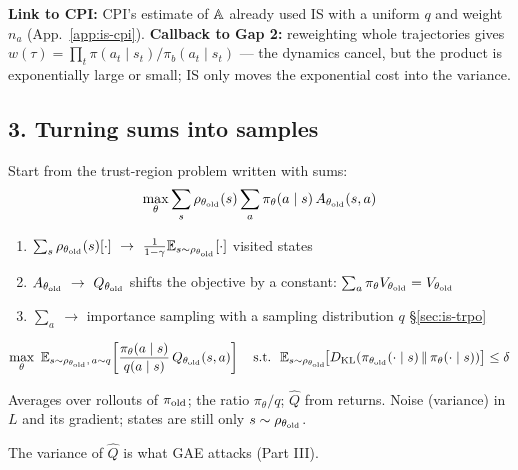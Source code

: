 \begin{notebox}
\textbf{Link to CPI:} CPI's estimate of $\mathbb{A}$ already used IS with a uniform $q$ and weight $n_a$ (App.~\ref{app:is-cpi}).
\textbf{Callback to Gap 2:} reweighting whole trajectories gives $w(\tau)=\prod_t\pi(a_t\mid s_t)/\pi_b(a_t\mid s_t)$ --- the dynamics cancel, but the product is exponentially large or small; IS only moves the exponential cost into the variance.
\end{notebox}

\subsection{3. Turning sums into samples}

Start from the trust-region problem written with sums:
\begin{gather*}
  \max_\theta \sum_s \rho_{\theta_{\mathrm{old}}}(s) \sum_a \pi_\theta(a\mid s)\, A_{\theta_{\mathrm{old}}}(s,a)
\end{gather*}

\begin{enumerate}
  \item $\sum_s\rho_{\told}(s)[\cdot]\ \to\ \frac{1}{1-\gamma}\E_{s\sim\rho_{\told}}[\cdot]$ \hfill {\small visited states}
  \item $A_{\theta_{\mathrm{old}}}\ \to\ Q_{\theta_{\mathrm{old}}}$ \hfill {\small shifts the objective by a constant: $\sum_a\pi_\theta V_{\theta_{\mathrm{old}}}=V_{\theta_{\mathrm{old}}}$}
  \item $\sum_a\ \to$ importance sampling with a sampling distribution $q$ \hfill {\small \S\ref{sec:is-trpo}}
\end{enumerate}

\begin{eqbox}
\begin{gather*}
  \max_\theta\ \E_{s\sim\rho_{\told},\,a\sim q}\!\left[\frac{\pi_\theta(a\mid s)}{q(a\mid s)}\,Q_{\told}(s,a)\right]
  \quad \text{s.t.}\ \ \E_{s\sim\rho_{\told}}\!\big[\DKL(\pi_{\told}(\cdot\mid s)\,\|\,\pi_\theta(\cdot\mid s))\big] \le \delta
\end{gather*}
\end{eqbox}

     {Averages over rollouts of $\pi_{\mathrm{old}}$; the ratio $\pi_\theta/q$; $\hat Q$ from returns.}
     {Noise (variance) in $L$ and its gradient; states are still only $s\sim\rho_{\theta_{\mathrm{old}}}$.}

{\small The variance of $\hat Q$ is what GAE attacks (Part III).}

